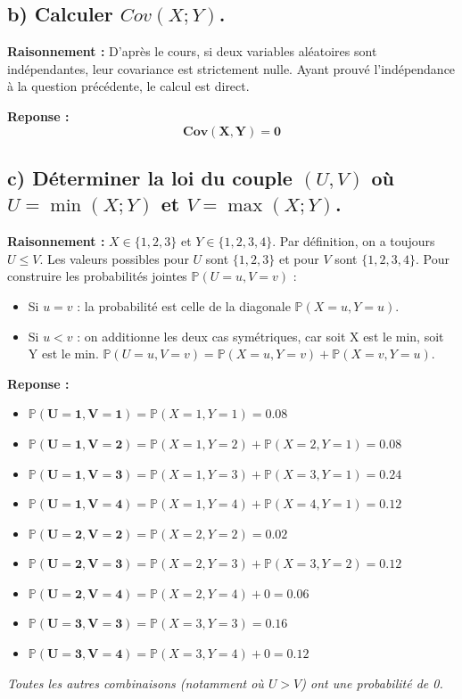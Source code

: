 \documentclass[11pt,a4paper]{article}
\begin{document}
\subsection*{b) Calculer $Cov(X;Y)$.}

\textbf{Raisonnement :} 
D'après le cours, si deux variables aléatoires sont indépendantes, leur covariance est strictement nulle. Ayant prouvé l'indépendance à la question précédente, le calcul est direct.

\textbf{Reponse :}
$$ \mathbf{Cov(X, Y) = 0} $$

\subsection*{c) Déterminer la loi du couple $(U, V)$ où $U = \min(X;Y)$ et $V = \max(X;Y)$.}

\textbf{Raisonnement :} 
$X \in \{1,2,3\}$ et $Y \in \{1,2,3,4\}$. Par définition, on a toujours $U \le V$. Les valeurs possibles pour $U$ sont $\{1,2,3\}$ et pour $V$ sont $\{1,2,3,4\}$.
Pour construire les probabilités jointes $\mathbb{P}(U=u, V=v)$ :
\begin{itemize}
    \item Si $u = v$ : la probabilité est celle de la diagonale $\mathbb{P}(X=u, Y=u)$.
    \item Si $u < v$ : on additionne les deux cas symétriques, car soit X est le min, soit Y est le min.
    $\mathbb{P}(U=u, V=v) = \mathbb{P}(X=u, Y=v) + \mathbb{P}(X=v, Y=u)$.
\end{itemize}

\textbf{Reponse :}
\begin{itemize}
    \item $\mathbf{\mathbb{P}(U=1, V=1)} = \mathbb{P}(X=1,Y=1) = \mathbf{0.08}$
    \item $\mathbf{\mathbb{P}(U=1, V=2)} = \mathbb{P}(X=1,Y=2) + \mathbb{P}(X=2,Y=1) = \mathbf{0.08}$
    \item $\mathbf{\mathbb{P}(U=1, V=3)} = \mathbb{P}(X=1,Y=3) + \mathbb{P}(X=3,Y=1) = \mathbf{0.24}$
    \item $\mathbf{\mathbb{P}(U=1, V=4)} = \mathbb{P}(X=1,Y=4) + \mathbb{P}(X=4,Y=1) = \mathbf{0.12}$
    \item $\mathbf{\mathbb{P}(U=2, V=2)} = \mathbb{P}(X=2,Y=2) = \mathbf{0.02}$
    \item $\mathbf{\mathbb{P}(U=2, V=3)} = \mathbb{P}(X=2,Y=3) + \mathbb{P}(X=3,Y=2) = \mathbf{0.12}$
    \item $\mathbf{\mathbb{P}(U=2, V=4)} = \mathbb{P}(X=2,Y=4) + 0 = \mathbf{0.06}$
    \item $\mathbf{\mathbb{P}(U=3, V=3)} = \mathbb{P}(X=3,Y=3) = \mathbf{0.16}$
    \item $\mathbf{\mathbb{P}(U=3, V=4)} = \mathbb{P}(X=3,Y=4) + 0 = \mathbf{0.12}$
\end{itemize}
\textit{Toutes les autres combinaisons (notamment où $U>V$) ont une probabilité de 0.}
\end{document}
